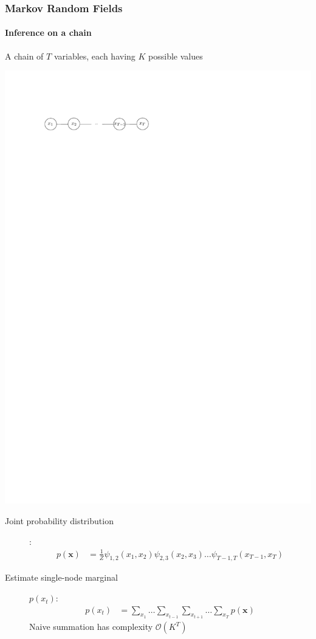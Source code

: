 \documentclass[slidestop,compress,mathserif]{beamer}
\begin{document}
\begin{frame}
	\frametitle{Markov Random Fields}
	\framesubtitle{Inference on a chain}
	A chain of $T$ variables, each having $K$ possible values
    \begin{center}
    \includegraphics[width=.6\textwidth]{chain0}
    \end{center}
    \begin{description}
    \item[Joint probability distribution]:
    \begin{align*}
    p(\mathbf{x})&=\frac{1}{Z}\psi_{1,2}(x_1,x_2)\psi_{2,3}(x_2,x_3) \hdots
       \psi_{T-1,T}(x_{T-1},x_T)
           \end{align*}
    \item[Estimate single-node marginal] $p(x_t)$:
    \begin{align*}
        p(x_t) & = \sum_{x_1}\hdots\sum_{x_{t-1}}\sum_{x_{t+1}}\hdots\sum_{x_T}p(\mathbf{x})
    \end{align*}
	Naive summation has complexity $\mathcal{O}(K^T)$
    \end{description}
  \end{frame} 
\end{document}
